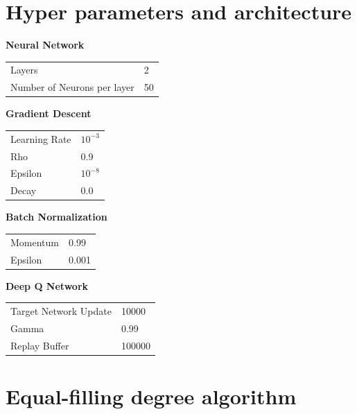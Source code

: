 \section{Hyper parameters and architecture}\label{SI:hyperparams}

\noindent\textbf{Neural Network}
\begin{table}[H]
\begin{tabular}{ll}
\toprule
Layers                      & 2  \\
Number of Neurons per layer & 50 \\
\bottomrule
\end{tabular}
\end{table}

\newpage

\noindent\textbf{Gradient Descent}
\begin{table}[H]
\begin{tabular}{ll}
\toprule
Learning Rate                      & $10^{-3}$  \\
Rho & 0.9 \\
Epsilon & $10^{-8}$ \\
Decay & 0.0\\
\bottomrule
\end{tabular}
\end{table}

\noindent\textbf{Batch Normalization}
\begin{table}[H]
\begin{tabular}{ll}
\toprule
Momentum                     & 0.99  \\
Epsilon & 0.001 \\
\bottomrule
\end{tabular}
\end{table}

\noindent\textbf{Deep Q Network}
\begin{table}[H]
\begin{tabular}{ll}
\toprule
Target Network Update                     & 10000  \\
Gamma & 0.99\\
Replay Buffer & 100000 \\
\bottomrule
\end{tabular}
\end{table}


\section{Equal-filling degree algorithm}\label{SI:equalfill}

